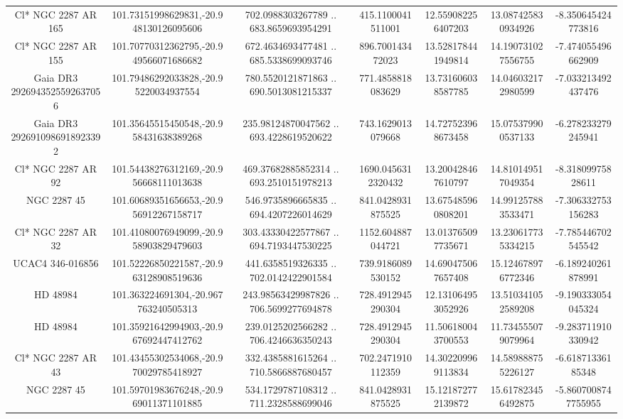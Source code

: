 \begin{table}
\begin{tabular}{ccccccc}
Cl* NGC 2287     AR     165 & 101.73151998629831,-20.948130126095606 & 702.0988303267789 .. 683.8659693954291 & 415.1100041511001 & 12.559082256407203 & 13.087425830934926 & -8.350645424773816 \\
Cl* NGC 2287     AR     155 & 101.70770312362795,-20.949566071686682 & 672.4634693477481 .. 685.5338699093746 & 896.700143472023 & 13.528178441949814 & 14.190731027556755 & -7.474055496662909 \\
Gaia DR3 2926943525592637056 & 101.79486292033828,-20.95220034937554 & 780.5520121871863 .. 690.5013081215337 & 771.4858818083629 & 13.731606038587785 & 14.046032172980599 & -7.033213492437476 \\
Gaia DR3 2926910986918923392 & 101.35645515450548,-20.958431638389268 & 235.98124870047562 .. 693.4228619520622 & 743.1629013079668 & 14.727523968673458 & 15.075379900537133 & -6.278233279245941 \\
Cl* NGC 2287     AR      92 & 101.54438276312169,-20.956668111013638 & 469.37682885852314 .. 693.2510151978213 & 1690.0456312320432 & 13.200428467610797 & 14.810149517049354 & -8.31809975828611 \\
NGC  2287    45 & 101.60689351656653,-20.956912267158717 & 546.9735896665835 .. 694.4207226014629 & 841.0428931875525 & 13.675485960808201 & 14.991257883533471 & -7.306332753156283 \\
Cl* NGC 2287     AR      32 & 101.41080076949099,-20.958903829479603 & 303.43330422577867 .. 694.7193447530225 & 1152.604887044721 & 13.013765097735671 & 13.230617735334215 & -7.785446702545542 \\
UCAC4 346-016856 & 101.52226850221587,-20.963128908519636 & 441.6358519326335 .. 702.0142422901584 & 739.9186089530152 & 14.690475067657408 & 15.124678976772346 & -6.189240261878991 \\
HD  48984 & 101.363224691304,-20.967763240505313 & 243.98563429987826 .. 706.5699277694878 & 728.4912945290304 & 12.131064953052926 & 13.510341052589208 & -9.190333054045324 \\
HD  48984 & 101.35921642994903,-20.967692447412762 & 239.0125202566282 .. 706.4246636350243 & 728.4912945290304 & 11.506180043700553 & 11.734555079079964 & -9.283711910330942 \\
Cl* NGC 2287     AR      43 & 101.43455302534068,-20.970029785418927 & 332.4385881615264 .. 710.5866887680457 & 702.2471910112359 & 14.302209969113834 & 14.589888755226127 & -6.61871336185348 \\
NGC  2287    45 & 101.59701983676248,-20.969011371101885 & 534.1729787108312 .. 711.2328588699046 & 841.0428931875525 & 15.121872772139872 & 15.617823456492875 & -5.8607008747755955 \\

\end{tabular}
\end{table}
